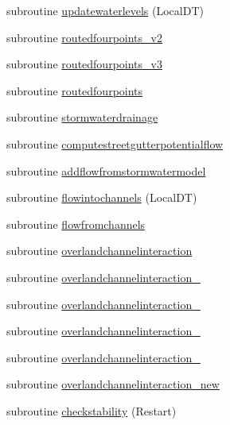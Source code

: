 \begin{DoxyCompactItemize}
\item 
subroutine \mbox{\hyperlink{namespacemodulerunoff_ae21623961ce63cf7c148437e7ad9d934}{updatewaterlevels}} (Local\+DT)
\item 
subroutine \mbox{\hyperlink{namespacemodulerunoff_aeedcf3916bc6da030fd004afb251262f}{routedfourpoints\+\_\+v2}}
\item 
subroutine \mbox{\hyperlink{namespacemodulerunoff_a7ca1b43ca23fdb3f25a304ec7ea33a92}{routedfourpoints\+\_\+v3}}
\item 
subroutine \mbox{\hyperlink{namespacemodulerunoff_a0a2296b090b1a35c74f3a4c0e35ad401}{routedfourpoints}}
\item 
subroutine \mbox{\hyperlink{namespacemodulerunoff_af4d68602fac4df4d58a06a8d87433a3b}{stormwaterdrainage}}
\item 
subroutine \mbox{\hyperlink{namespacemodulerunoff_a275dc22b830688ac27f2e1ab0cec626c}{computestreetgutterpotentialflow}}
\item 
subroutine \mbox{\hyperlink{namespacemodulerunoff_abba7c93964c033b2908d8af2d841a8db}{addflowfromstormwatermodel}}
\item 
subroutine \mbox{\hyperlink{namespacemodulerunoff_a08312a51cf0c25b5c2019c42750e1673}{flowintochannels}} (Local\+DT)
\item 
subroutine \mbox{\hyperlink{namespacemodulerunoff_ad9add85fb1e5efe5eb239bb72e597945}{flowfromchannels}}
\item 
subroutine \mbox{\hyperlink{namespacemodulerunoff_a5181922fc72d5c17acb9fdf3127d6318}{overlandchannelinteraction}}
\item 
subroutine \mbox{\hyperlink{namespacemodulerunoff_a83d1f0b3f63668b07444f05e9e5bcf7c}{overlandchannelinteraction\+\_}}
\item 
subroutine \mbox{\hyperlink{namespacemodulerunoff_af059c1ee46f4d88ba5904020c0d1edfd}{overlandchannelinteraction\+\_}}
\item 
subroutine \mbox{\hyperlink{namespacemodulerunoff_add510de98548d322d9084c2782b07388}{overlandchannelinteraction\+\_}}
\item 
subroutine \mbox{\hyperlink{namespacemodulerunoff_a5389b89d2ccfe710976c31b556113eca}{overlandchannelinteraction\+\_}}
\item 
subroutine \mbox{\hyperlink{namespacemodulerunoff_a03f16d8e0cac2434944d8e8ac46db4c2}{overlandchannelinteraction\+\_\+new}}
\item 
subroutine \mbox{\hyperlink{namespacemodulerunoff_a330dcdf852e8d32ad8f61027fca5572d}{checkstability}} (Restart)
\item 

\end{DoxyCompactItemize}
